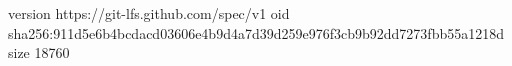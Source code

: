 version https://git-lfs.github.com/spec/v1
oid sha256:911d5e6b4bcdacd03606e4b9d4a7d39d259e976f3cb9b92dd7273fbb55a1218d
size 18760

